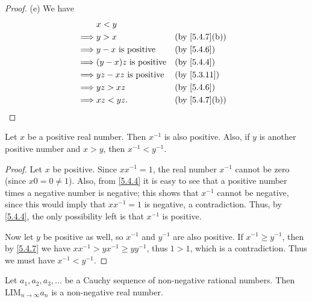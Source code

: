 \begin{proof}{(e)}
  We have
  \begin{align*}
             & x < y                                           \\
    \implies & y > x                        &  & \by{5.4.7}[b] \\
    \implies & y - x \text{ is positive}    &  & \by{5.4.6}    \\
    \implies & (y - x)z \text{ is positive} &  & \by{5.4.4}    \\
    \implies & yz - xz \text{ is positive}  &  & \by{5.3.11}   \\
    \implies & yz > xz                      &  & \by{5.4.6}    \\
    \implies & xz < yz.                     &  & \by{5.4.7}[b]
  \end{align*}
\end{proof}

\begin{prop}\label{5.4.8}
  Let \(x\) be a positive real number.
  Then \(x^{-1}\) is also positive.
  Also, if \(y\) is another positive number and \(x > y\), then \(x^{-1} < y^{-1}\).
\end{prop}

\begin{proof}
  Let \(x\) be positive.
  Since \(xx^{-1} = 1\), the real number \(x^{-1}\) cannot be zero (since \(x0 = 0 \neq 1\)).
  Also, from \cref{5.4.4} it is easy to see that a positive number times a negative number is negative;
  this shows that \(x^{-1}\) cannot be negative, since this would imply that \(xx^{-1} = 1\) is negative, a contradiction.
  Thus, by \cref{5.4.4}, the only possibility left is that \(x^{-1}\) is positive.

  Now let \(y\) be positive as well, so \(x^{-1}\) and \(y^{-1}\) are also positive.
  If \(x^{-1} \geq y^{-1}\), then by \cref{5.4.7} we have \(xx^{-1} > yx^{-1} \geq yy^{-1}\), thus \(1 > 1\), which is a contradiction.
  Thus we must have \(x^{-1} < y^{-1}\).
\end{proof}

\begin{prop}\label{5.4.9}
  Let \(a_1, a_2, a_3, \dots\) be a Cauchy sequence of non-negative rational numbers.
  Then \(\text{LIM}_{n \to \infty} a_n\) is a non-negative real number.
\end{prop}


